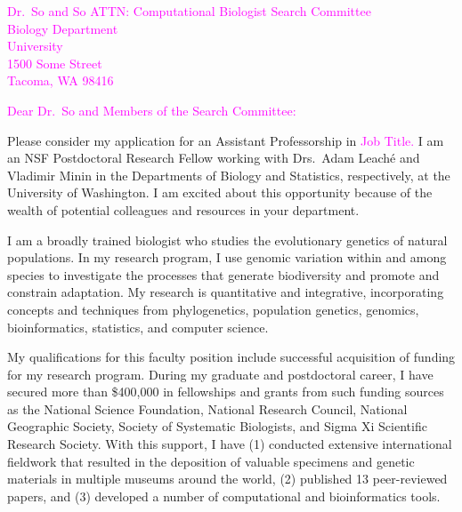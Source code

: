 \documentclass[letterpaper, 10pt]{letter}
\newcommand{\highlight}[1]{\textcolor{magenta}{#1}}
\begin{document}
\begin{letter}{
        \highlight{
        Dr.\ So  and So
        ATTN: Computational Biologist Search Committee \\
        Biology Department \\
        University \\
        1500 Some Street \\
        Tacoma, WA 98416
        }
    }
\opening{
    \highlight{
    Dear Dr.\ So and Members of the Search Committee:
    }
}
Please consider my application for an Assistant Professorship in
\highlight{
Job Title.
}
I am an NSF Postdoctoral Research Fellow working with Drs.\ Adam Leach\'{e} and
Vladimir Minin in the Departments of Biology and Statistics, respectively, at
the University of Washington.
I am excited about this opportunity because of the wealth of potential
colleagues and resources in your department.

I am a broadly trained biologist who studies the evolutionary genetics of
natural populations.
In my research program, I use genomic variation within and among species to
investigate the processes that generate biodiversity and promote and constrain
adaptation.
My research is quantitative and integrative, incorporating concepts and
techniques from phylogenetics, population genetics, genomics, bioinformatics,
statistics, and computer science.

My qualifications for this faculty position include successful acquisition
of funding for my research program.
During my graduate and postdoctoral career, I have secured more than
\$400,000 in fellowships and grants from such funding sources as the 
National Science Foundation,
National Research Council,
National Geographic Society,
Society of Systematic Biologists, and
Sigma Xi Scientific Research Society.
With this support, I have
(1) conducted extensive international fieldwork that resulted in
the deposition of valuable specimens and genetic materials in multiple
museums around the world,
(2) published 13 peer-reviewed papers, and
(3) developed a number of computational and bioinformatics tools.


\end{letter}
\end{document}
